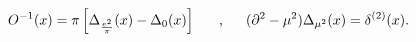 \begin{equation}
O^{-1}(x)=\pi\left[ \Delta_{\frac{e^2}{\pi}}(x)-\Delta_0(x)\right]\makebox[.5in]{,}
(\partial^2-\mu^2)\Delta_{\mu^2}(x)=\delta^{(2)}(x).
\label{inverse}
\end{equation}

